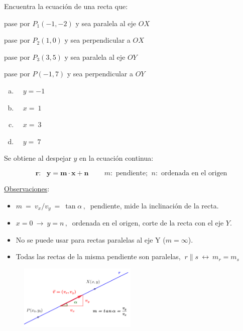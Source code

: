 \begin{miejemplo}

Encuentra la ecuación de una recta que:

\begin{multicols}{2}
\begin{enumerate}[a) ]
\begin{footnotesize}
\item {pase por $P_1(-1,-2)$ y sea paralela al eje $OX$}
\item pase por $P_2(1,0)$ y sea perpendicular a $OX$
\item pase por $P_3(3,5)$ y sea paralela al eje $OY$
\item pase por $P(-1,7)$ y sea perpendicular a $OY$	
\end{footnotesize}
\end{enumerate}

\begin{enumerate}[a) ]
\item $\quad y=-1$
\item $\quad x=\ 1$
\item $\quad x=\ 3$
\item $\quad y=\ 7$	
\end{enumerate}

 
\end{multicols}
\end{miejemplo}



\vspace{5mm}
\begin{definition}
	
	Se obtiene al despejar $y$ en la ecuación continua:     
	
	$$\boxed{ \ \boldsymbol{ r:\  \ \  y = m \cdot x + n } \ } \qquad     m:\text{ pendiente; } \  n: \text{ ordenada en el origen}$$
\end{definition}
\underline{Observaciones}:
\begin{multicols}{2}
\begin{itemize}
\item $m\ = \ v_x/v_y \ =\ \tan \alpha\, , \ $ pendiente, mide la inclinación de la recta.
\item $x=0 \ \to \ y=n\, , \ $ ordenada en el origen, corte de la recta con el eje $Y$.
\item No se puede usar para rectas paralelas al eje Y \textcolor{gris}{($m=\infty$)}.
\item Todas las rectas de la misma pendiente son paralelas, $\ r\parallel s \ \leftrightarrow \ m_r=m_s$
\end{itemize}
\begin{figure}[H]
	\centering
	\includegraphics[width=0.5\textwidth]{img-ga/ga13.png}
\end{figure}
\end{multicols}

